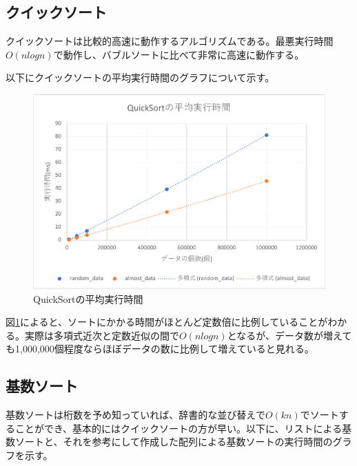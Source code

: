 \documentclass[a4j,dvipdfmx]{jsreport}
\begin{document}
\subsection{クイックソート}
クイックソートは比較的高速に動作するアルゴリズムである。最悪実行時間$O(nlogn)$で動作し、バブルソートに比べて非常に高速に動作する。\par
以下にクイックソートの平均実行時間のグラフについて示す。
 \begin{figure}[H]
    \centering
    \includegraphics[keepaspectratio,width=\linewidth]{figure2.pdf}
    \caption{QuickSortの平均実行時間}
    \label{fig:QS}
\end{figure}

図\ref{fig:QS}によると、ソートにかかる時間がほとんど定数倍に比例していることがわかる。実際は多項式近次と定数近似の間で$O(nlogn)$となるが、データ数が増えても1,000,000個程度ならほぼデータの数に比例して増えていると見れる。
\newpage
\subsection{基数ソート}
基数ソートは桁数を予め知っていれば、辞書的な並び替えで$O(kn)$でソートすることができ、基本的にはクイックソートの方が早い。以下に、リストによる基数ソートと、それを参考にして作成した配列による基数ソートの実行時間のグラフを示す。
\end{document}
